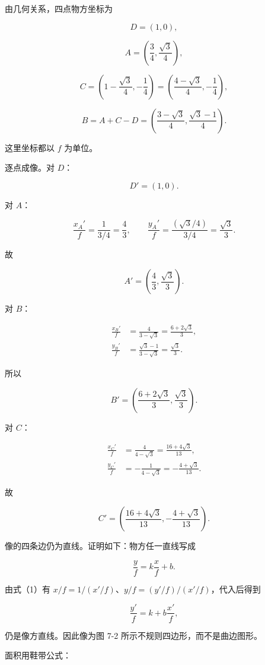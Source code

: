 \documentclass[12pt,a4paper,UTF8]{ctexart}
\begin{document}
由几何关系，四点物方坐标为

\[
D=(1,0), \tag{2}
\]

\[
A=\left(\frac34,\frac{\sqrt3}{4}\right), \tag{3}
\]

\[
C=\left(1-\frac{\sqrt3}{4},-\frac14\right)
=\left(\frac{4-\sqrt3}{4},-\frac14\right), \tag{4}
\]

\[
B=A+C-D
=\left(\frac{3-\sqrt3}{4},
\frac{\sqrt3-1}{4}\right). \tag{5}
\]

这里坐标都以 \(f\) 为单位。

逐点成像。对 \(D\)：

\[
\boxed{D'=(1,0)}. \tag{6}
\]

对 \(A\)：

\[
\frac{x_A'}f=\frac{1}{3/4}=\frac43,\qquad
\frac{y_A'}f=\frac{(\sqrt3/4)}{3/4}=\frac{\sqrt3}{3}. \tag{7}
\]

故

\[
\boxed{A'=\left(\frac43,\frac{\sqrt3}{3}\right)}. \tag{8}
\]

对 \(B\)：

\[
\begin{aligned}
\frac{x_B'}f
&=\frac4{3-\sqrt3}
=\frac{6+2\sqrt3}{3},\\
\frac{y_B'}f
&=\frac{\sqrt3-1}{3-\sqrt3}
=\frac{\sqrt3}{3}.
\end{aligned} \tag{9}
\]

所以

\[
\boxed{
B'=\left(\frac{6+2\sqrt3}{3},\frac{\sqrt3}{3}\right)}. \tag{10}
\]

对 \(C\)：

\[
\begin{aligned}
\frac{x_C'}f
&=\frac4{4-\sqrt3}
=\frac{16+4\sqrt3}{13},\\
\frac{y_C'}f
&=-\frac1{4-\sqrt3}
=-\frac{4+\sqrt3}{13}.
\end{aligned} \tag{11}
\]

故

\[
\boxed{
C'=\left(\frac{16+4\sqrt3}{13},
-\frac{4+\sqrt3}{13}\right)}. \tag{12}
\]

像的四条边仍为直线。证明如下：物方任一直线写成

\[
\frac yf=k\frac xf+b. \tag{13}
\]

由式（1）有 \(x/f=1/(x'/f)\)、\(y/f=(y'/f)/(x'/f)\)，代入后得到

\[
\frac{y'}f=k+b\frac{x'}f, \tag{14}
\]

仍是像方直线。因此像为图 7-2 所示不规则四边形，而不是曲边图形。

面积用鞋带公式：
\end{document}
